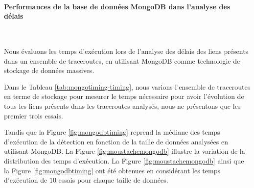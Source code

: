 \paragraph{Performances de la base de données MongoDB dans l'analyse des délais }~

Nous évaluons les temps d'exécution lors de l'analyse des délais des liens présents dans un ensemble de traceroutes, en utilisant MongoDB comme technologie de stockage de données massives.   


Dans le Tableau \ref{tab:mongotiming-timing}, nous varions l'ensemble de traceroutes en terme de stockage pour mesurer le temps nécessaire pour avoir  l'évolution de tous les liens présents dans  les traceroutes analysés, nous ne présentons que les premier trois essais. 


\begin{table}[H]
	\captionsetup{justification=centering}
\caption{Les temps d'exécution d'analyse de traceroutes en fonction de la taille de données avec MongoDB}
\label{tab:mongotiming-timing}
\end{table}

Tandis que la  Figure \ref{fig:mongodbtiming}	 reprend la médiane  des temps d'exécution de la détection en fonction de  la taille de données analysées en utilisant MongoDB. 
La Figure 	 \ref{fig:moustachemongodb} illustre la variation de la distribution des temps d'exécution. La Figure 	 \ref{fig:moustachemongodb} ainsi que la Figure \ref{fig:mongodbtiming} ont été obtenues en considérant les temps d'exécution de $10$ essais pour chaque taille de données.

